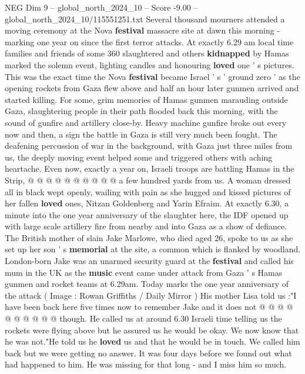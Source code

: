 \begin{textsample}{NEG Dim 9 – global\_north\_2024\_10 – Score -9.00 – global\_north\_2024\_10/115551251.txt}  \label{ex:f9_neg_047}
Several thousand mourners attended a moving ceremony at the Nova \textbf{festival} massacre site at dawn this morning - marking one year on since the first terror attacks.
At exactly 6.29 am local time families and friends of some 360 slaughtered and others \textbf{kidnapped} by Hamas marked the solemn event, lighting candles and honouring \textbf{loved} one ' s pictures.
This was the exact time the Nova \textbf{festival} became Israel ' s ' ground zero ' as the opening rockets from Gaza flew above and half an hour later gunmen arrived and started killing.
For some, grim memories of Hamas gunmen marauding outside Gaza, slaughtering people in their path flooded back this morning, with the sound of gunfire and artillery close-by.
Heavy machine gunfire broke out every now and then, a sign the battle in Gaza is still very much been fought.
The deafening percussion of war in the background, with Gaza just three miles from us, the deeply moving event helped some and triggered others with aching heartache.
Even now, exactly a year on, Israeli troops are battling Hamas in the Strip, @ @ @ @ @ @ @ @ @ @ a few hundred yards from us.
A woman dressed all in black wept openly, wailing with pain as she hugged and kissed pictures of her fallen \textbf{loved} ones, Nitzan Goldenberg and Yarin Efraim.
At exactly 6.30, a minute into the one year anniversary of the slaughter here, the IDF opened up with large scale artillery fire from nearby and into Gaza as a show of defiance.
The British mother of slain Jake Marlowe, who died aged 26, spoke to us as she set up her son ' s \textbf{memorial} at the site, a common which is flanked by woodland.
London-born Jake was an unarmed security guard at the \textbf{festival} and called his mum in the UK as the \textbf{music} event came under attack from Gaza ' s Hamas gunmen and rocket teams at 6.29am.
Today marks the one year anniversary of the attack ( Image : Rowan Griffiths / Daily Mirror ) His mother Lisa told us :"I have been back here five times now to remember Jake and it does not @ @ @ @ @ @ @ @ @ @ though.
He called us at around 6.30 Israeli time telling us the rockets were flying above but he assured us he would be okay.
We now know that he was not."He told us he \textbf{loved} us and that he would be in touch.
We called him back but we were getting no answer.
It was four days before we found out what had happened to him.
He was missing for that long - and I miss him so much.

\end{textsample}
